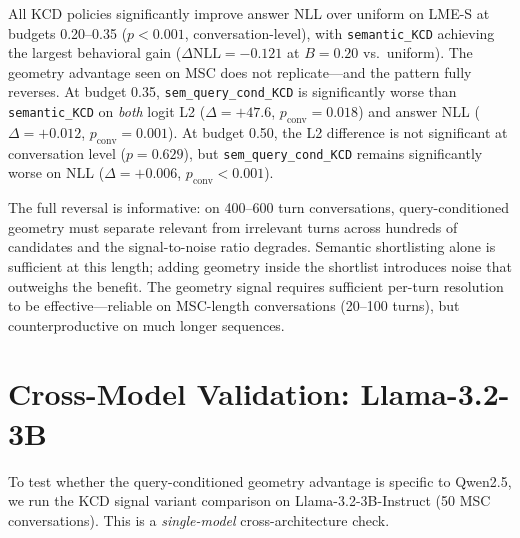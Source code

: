 \documentclass[11pt]{article}
\newcommand{\pname}[1]{\texttt{\small #1}}
\begin{document}
All KCD policies significantly improve answer NLL over uniform on LME-S at budgets 0.20--0.35 ($p{<}0.001$, conversation-level), with \pname{semantic\_KCD} achieving the largest behavioral gain ($\Delta\mathrm{NLL}=-0.121$ at $B{=}0.20$ vs.\ uniform). The geometry advantage seen on MSC does not replicate---and the pattern fully reverses. At budget 0.35, \pname{sem\_query\_cond\_KCD} is significantly worse than \pname{semantic\_KCD} on \emph{both} logit L2 ($\Delta=+47.6$, $p_\mathrm{conv}=0.018$) and answer NLL ($\Delta=+0.012$, $p_\mathrm{conv}=0.001$). At budget 0.50, the L2 difference is not significant at conversation level ($p=0.629$), but \pname{sem\_query\_cond\_KCD} remains significantly worse on NLL ($\Delta=+0.006$, $p_\mathrm{conv}{<}0.001$).

The full reversal is informative: on 400--600 turn conversations, query-conditioned geometry must separate relevant from irrelevant turns across hundreds of candidates and the signal-to-noise ratio degrades. Semantic shortlisting alone is sufficient at this length; adding geometry inside the shortlist introduces noise that outweighs the benefit. The geometry signal requires sufficient per-turn resolution to be effective---reliable on MSC-length conversations (20--100 turns), but counterproductive on much longer sequences.

\section{Cross-Model Validation: Llama-3.2-3B}
To test whether the query-conditioned geometry advantage is specific to Qwen2.5, we run the KCD signal variant comparison on Llama-3.2-3B-Instruct (50 MSC conversations). This is a \emph{single-model} cross-architecture check.

\begin{table}[t]
\centering
\caption{Cross-model check on MSC (\pname{llama32\_3b}, 50 conversations). Semantic-KCD vs.\ geometry-KCD behavior NLL differences are significant at conversation level at all budgets ($p=0.007$, $0.026$, $0.009$). Logit L2 differences are not significant at conversation level (all $p>0.14$).}
\label{tab:llama3b}
\end{table}
\end{document}
